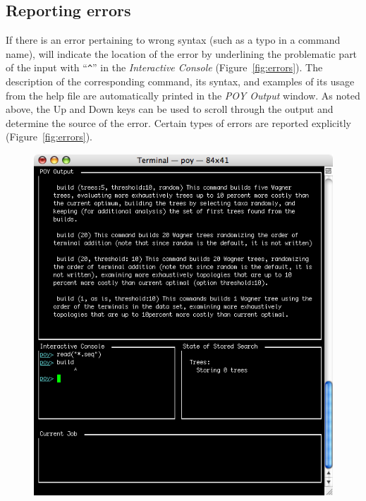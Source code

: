 \subsection{Reporting errors}
If there is an error pertaining to wrong syntax (such as a typo in a command name), \poy will indicate the location of the error by underlining the problematic part of the input with ``\texttt{\^}'' in the \emph{Interactive Console} (Figure~\ref{fig:errors}). The description of the corresponding command, its syntax, and examples of its usage from the help file are automatically printed in the \emph{POY Output} window. As noted above, the Up and Down keys can be used to scroll through the output and determine the source of the error. Certain types of errors are reported explicitly (Figure~\ref{fig:errors}).

\begin{figure}
\centering
\begin{minipage}[c]{0.48\textwidth}
   		\includegraphics[width=\textwidth]{figures/figerror1.jpg}
\end{minipage}%
\quad
\begin{minipage}[c]{0.48\textwidth}

\end{minipage}
\end{figure}
